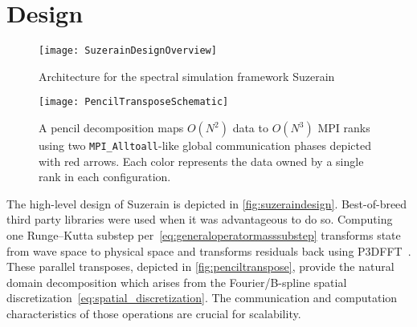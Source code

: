 \section{Design}

\begin{figure}
\centering
\texttt{[image: SuzerainDesignOverview]}
\\
\caption{%
    Architecture for the spectral
    simulation framework Suzerain\label{fig:suzeraindesign}
}
\end{figure}

\begin{figure}
\centering
\texttt{[image: PencilTransposeSchematic]}
\\
\caption[Parallel data movement stages for pencil decompositions]{%
  A pencil decomposition maps $O(N^2)$ data to $O(N^3)$ MPI ranks using two
  \texttt{MPI\_Alltoall}-like global communication phases depicted with red
  arrows.  Each color represents the data owned by a single rank in each
  configuration.  \label{fig:penciltranspose}
}
\end{figure}

The high-level design of Suzerain is depicted in \autoref{fig:suzeraindesign}.
Best-of-breed third party libraries were used when it was advantageous to
do so.  Computing one Runge--Kutta substep
per~\eqref{eq:generaloperatormasssubstep} transforms state from wave space to
physical space and transforms residuals back using P3DFFT~\citep{P3DFFTweb}.  These parallel
transposes, depicted in \autoref{fig:penciltranspose}, provide the natural
domain decomposition which arises from the Fourier/B-spline spatial
discretization~\eqref{eq:spatial_discretization}.  The communication and
computation characteristics of those operations are crucial for scalability.

